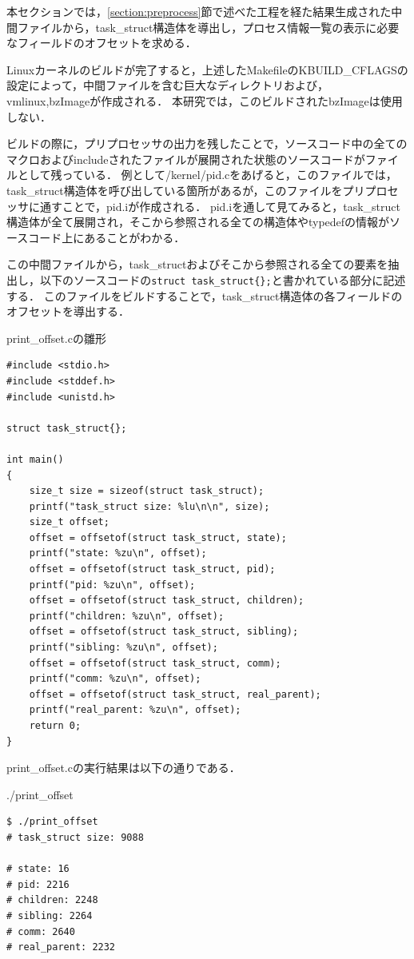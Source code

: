 本セクションでは，\ref{section:preprocess}節で述べた工程を経た結果生成された中間ファイルから，task\_struct構造体を導出し，プロセス情報一覧の表示に必要なフィールドのオフセットを求める．

Linuxカーネルのビルドが完了すると，上述したMakefileのKBUILD_CFLAGSの設定によって，中間ファイルを含む巨大なディレクトリおよび，vmlinux,bzImageが作成される．
本研究では，このビルドされたbzImageは使用しない．

ビルドの際に，プリプロセッサの出力を残したことで，ソースコード中の全てのマクロおよびincludeされたファイルが展開された状態のソースコードがファイルとして残っている．
例として/kernel/pid.cをあげると，このファイルでは，task\_struct構造体を呼び出している箇所があるが，このファイルをプリプロセッサに通すことで，pid.iが作成される．
pid.iを通して見てみると，task\_struct構造体が全て展開され，そこから参照される全ての構造体やtypedefの情報がソースコード上にあることがわかる．

この中間ファイルから，task\_structおよびそこから参照される全ての要素を抽出し，以下のソースコードの\verb|struct task_struct{};|と書かれている部分に記述する．
このファイルをビルドすることで，task\_struct構造体の各フィールドのオフセットを導出する．

\begin{itembox}[l]{print_offset.cの雛形}
    \begin{verbatim}
#include <stdio.h>
#include <stddef.h>
#include <unistd.h>

struct task_struct{};

int main()
{
    size_t size = sizeof(struct task_struct);
    printf("task_struct size: %lu\n\n", size);
    size_t offset;
    offset = offsetof(struct task_struct, state);
    printf("state: %zu\n", offset);
    offset = offsetof(struct task_struct, pid);
    printf("pid: %zu\n", offset);
    offset = offsetof(struct task_struct, children);
    printf("children: %zu\n", offset);
    offset = offsetof(struct task_struct, sibling);
    printf("sibling: %zu\n", offset);
    offset = offsetof(struct task_struct, comm);
    printf("comm: %zu\n", offset);
    offset = offsetof(struct task_struct, real_parent);
    printf("real_parent: %zu\n", offset);
    return 0;
}
    \end{verbatim}
\end{itembox}

print\_offset.cの実行結果は以下の通りである．

\begin{itembox}[l]{./print_offset}
    \begin{verbatim}
$ ./print_offset
# task_struct size: 9088

# state: 16
# pid: 2216
# children: 2248
# sibling: 2264
# comm: 2640
# real_parent: 2232
    \end{verbatim}
\end{itembox}

